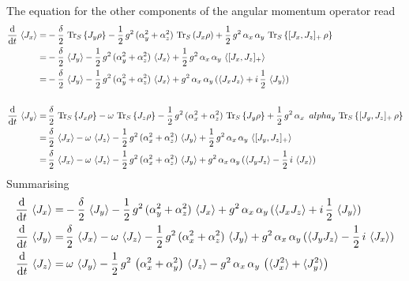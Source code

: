 \documentclass{article}
\begin{document}
The equation for the other components of the angular momentum operator read
\begin{align*}
    \frac{\text{d}}{\text{d}t}\,\braket{J_x}=&-\frac{\delta}{2}\,\operatorname{Tr}_S\left\{J_y\rho\right\}-\frac{1}{2}\,g^2\,(\alpha_y^2+\alpha_z^2)\,\operatorname{Tr}_S\left(J_x \rho\right)+\frac{1}{2}\,g^2\,\alpha_x\,\alpha_y\,\operatorname{Tr}_S\left\{[J_x,J_z]_+\,\rho\right\}\\
    =&-\frac{\delta}{2}\,\braket{J_y}-\frac{1}{2}\,g^2\,(\alpha_y^2+\alpha_z^2)\,\braket{J_x}+\frac{1}{2}\,g^2\,\alpha_x\,\alpha_y\,\braket{[J_x,J_z]_+}\\
    =&-\frac{\delta}{2}\,\braket{J_y}-\frac{1}{2}\,g^2\,(\alpha_y^2+\alpha_z^2)\,\braket{J_x}+g^2\,\alpha_x\,\alpha_y\,(\braket{J_xJ_z}+i\,\frac{1}{2}\,\braket{J_y})\\\\
    \frac{\text{d}}{\text{d}t}\,\braket{J_y}=&\,\frac{\delta}{2}\,\operatorname{Tr}_S\left\{J_x\rho\right\}-\omega\,\operatorname{Tr}_S\left\{J_z\rho\right\}-\frac{1}{2}\,g^2\,(\alpha_x^2+\alpha_z^2)\,\operatorname{Tr}_S\left\{J_y\rho\right\}+\frac{1}{2}\,g^2\,\alpha_x\,\           alpha_y\,\operatorname{Tr}_S\left\{[J_y,J_z]_+\,\rho\right\}\\
    =&\,\frac{\delta}{2}\,\braket{J_x}-\omega\,\braket{J_z}-\frac{1}{2}\,g^2\,(\alpha_x^2+\alpha_z^2)\,\braket{J_y}+\frac{1}{2}\,g^2\,\alpha_x\,\alpha_y\,\braket{[J_y,J_z]_+}\\
    =&\,\frac{\delta}{2}\,\braket{J_x}-\omega\,\braket{J_z}-\frac{1}{2}\,g^2\,(\alpha_x^2+\alpha_z^2)\,\braket{J_y}+g^2\,\alpha_x\,\alpha_y\,(\braket{J_yJ_z}-\frac{1}{2}\,i\,\braket{J_x})
\end{align*}
Summarising
\begin{align*}
     \frac{\text{d}}{\text{d}t}\,\braket{J_x}=&-\frac{\delta}{2}\,\braket{J_y}-\frac{1}{2}\,g^2\,(\alpha_y^2+\alpha_z^2)\,\braket{J_x}+g^2\,\alpha_x\,\alpha_y\,(\braket{J_xJ_z}+i\,\frac{1}{2}\,\braket{J_y})\\
     \frac{\text{d}}{\text{d}t}\,\braket{J_y}=&\,\frac{\delta}{2}\,\braket{J_x}-\omega\,\braket{J_z}-\frac{1}{2}\,g^2\,(\alpha_x^2+\alpha_z^2)\,\braket{J_y}+g^2\,\alpha_x\,\alpha_y\,(\braket{J_yJ_z}-\frac{1}{2}\,i\,\braket{J_x})\\
     \frac{\text{d}}{\text{d}t}\,\braket{J_z}=&\:\omega\,\braket{J_y}-\frac{1}{2}\,g^2\,\left(\alpha_x^2+\alpha_y^2\right)\,\braket{J_z}-g^2\,\alpha_x\,\alpha_y\,\left(\braket{J_x^2}+\braket{J_y^2}\right)
\end{align*}
\end{document}
